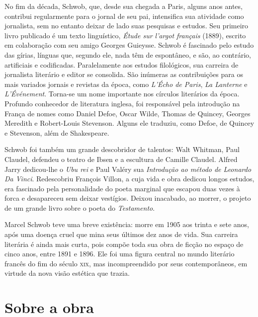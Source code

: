 
No fim da década, Schwob, que, desde sua chegada a Paris, alguns anos antes,
contribui regularmente para o jornal de seu pai, intensifica sua atividade como
jornalista, sem no entanto deixar de lado suas pesquisas e estudos. Seu
primeiro livro publicado é um texto linguístico, \textit{Étude sur l’argot
français} (1889), escrito em colaboração com seu amigo Georges Guieysse. Schwob
é fascinado pelo estudo das gírias, línguas que, segundo ele, nada têm de
espontâneo, e são, ao contrário, artificiais e codificadas. Paralelamente aos
estudos filológicos, sua carreira de jornalista literário e editor se
consolida. São inúmeras as contribuições para os mais variados jornais e
revistas da época, como \textit{L’Écho de Paris}, \textit{La Lanterne} e
\textit{L’Événement}. Torna-se um nome importante nos círculos literários da
época. Profundo conhecedor de literatura inglesa, foi responsável pela
introdução na França de nomes como Daniel Defoe, Oscar Wilde, Thomas de
Quincey, Georges Meredith e Robert-Louis Stevenson. Alguns ele traduziu, como
Defoe, de Quincey e Stevenson, além de Shakespeare.

Schwob foi também um grande descobridor de talentos: Walt Whitman, Paul
Claudel, defendeu o teatro de Ibsen e a escultura de Camille Claudel. Alfred
Jarry dedicou-lhe o \textit{Ubu rei} e Paul Valéry sua \textit{Introdução ao
método de Leonardo Da Vinci}. Redescobriu François Villon, a cuja vida e obra
dedicou longos estudos, era fascinado pela personalidade do poeta marginal que
escapou duas vezes à forca e desapareceu sem deixar vestígios. Deixou
inacabado, ao morrer, o projeto de um grande livro sobre o poeta do
\textit{Testamento}.

Marcel Schwob teve uma breve existência: morre em 1905 aos trinta e sete
anos, após uma doença cruel que mina seus últimos dez anos de vida. Sua
carreira literária é ainda mais curta, pois compõe toda sua obra de ficção no
espaço de cinco anos, entre 1891 e 1896. Ele foi uma figura central no mundo
literário francês do fim do século \textsc{xix}, mas incompreendido por seus
contemporâneos, em virtude da nova visão estética que trazia.

\section{Sobre a obra}

